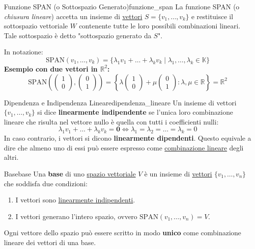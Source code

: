 \documentclass{article}
\begin{document}
\begin{definition}{Funzione SPAN (o Sottospazio Generato)}{funzione_span}
    La funzione SPAN (o \textit{chiusura lineare}) accetta un insieme di \hyperref[def:vettore]{vettori} $S = \{v_1, \dots, v_k\}$ e restituisce il sottospazio vettoriale $W$ contenente tutte le loro possibili combinazioni lineari. Tale sottospazio è detto "sottospazio generato da $S$".
    
    In notazione:
    \[ \text{SPAN}(v_1, \dots, v_k) = \{ \lambda_1 v_1 + \dots + \lambda_k v_k \mid \lambda_1, \dots, \lambda_k \in \mathbb{K} \} \]
    \textbf{Esempio con due vettori in $\mathbb{R}^2$:}
    \[ \text{SPAN}\left(\begin{pmatrix} 1 \\ 0 \end{pmatrix}, \begin{pmatrix} 0 \\ 1 \end{pmatrix}\right) = \left\{ \lambda\begin{pmatrix} 1 \\ 0 \end{pmatrix} + \mu\begin{pmatrix} 0 \\ 1 \end{pmatrix} : \lambda, \mu \in \mathbb{R}\right\} = \mathbb{R}^2 \]
\end{definition}

\begin{definition}{Dipendenza e Indipendenza Lineare}{dipendenza_lineare}
    Un insieme di vettori $\{v_1, \dots, v_k\}$ si dice \textbf{linearmente indipendente} se l'unica loro combinazione lineare che risulta nel vettore nullo è quella con tutti i coefficienti nulli:
    \[ \lambda_1 v_1 + \dots + \lambda_k v_k = \mathbf{0} \iff \lambda_1 = \lambda_2 = \dots = \lambda_k = 0 \]
    In caso contrario, i vettori si dicono \textbf{linearmente dipendenti}. Questo equivale a dire che almeno uno di essi può essere espresso come \hyperref[def:combinazione_lineare]{combinazione lineare} degli altri.
\end{definition}

\begin{definition}{Base}{base}
    Una \textbf{base} di uno \hyperref[def:spazio_vettoriale]{spazio vettoriale} $V$ è un insieme di \hyperref[def:vettore]{vettori} $\{v_1, \dots, v_n\}$ che soddisfa due condizioni:
    \begin{enumerate}
        \item I vettori sono \hyperref[def:dipendenza_lineare]{linearmente indipendenti}.
        \item I vettori generano l'intero spazio, ovvero $\text{SPAN}(v_1, \dots, v_n) = V$.
    \end{enumerate}
    Ogni vettore dello spazio può essere scritto in modo \textbf{unico} come combinazione lineare dei vettori di una base.
\end{definition}
\end{document}
